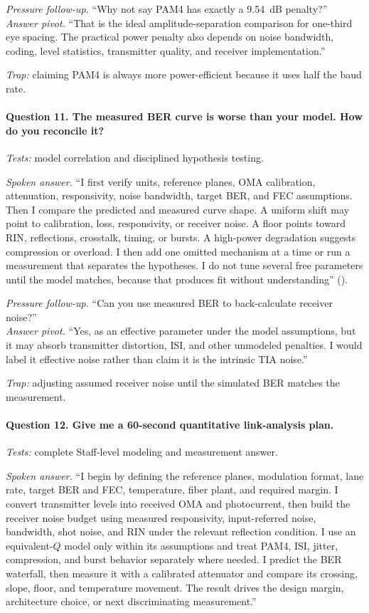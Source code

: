 \textit{Pressure follow-up.} ``Why not say PAM4 has exactly a 9.54~dB
penalty?''\\
\textit{Answer pivot.} ``That is the ideal amplitude-separation comparison for
one-third eye spacing. The practical power penalty also depends on noise
bandwidth, coding, level statistics, transmitter quality, and receiver
implementation.''

\textit{Trap:} claiming PAM4 is always more power-efficient because it uses half
the baud rate.

\paragraph{Question 11. The measured BER curve is worse than your model. How do
you reconcile it?}
\textit{Tests:} model correlation and disciplined hypothesis testing.

\textit{Spoken answer.}
``I first verify units, reference planes, OMA calibration, attenuation,
responsivity, noise bandwidth, target BER, and FEC assumptions. Then I compare
the predicted and measured curve shape. A uniform shift may point to
calibration, loss, responsivity, or receiver noise. A floor points toward RIN,
reflections, crosstalk, timing, or bursts. A high-power degradation suggests
compression or overload. I then add one omitted mechanism at a time or run a
measurement that separates the hypotheses. I do not tune several free parameters
until the model matches, because that produces fit without understanding''
().

\textit{Pressure follow-up.} ``Can you use measured BER to back-calculate
receiver noise?''\\
\textit{Answer pivot.} ``Yes, as an effective parameter under the model
assumptions, but it may absorb transmitter distortion, ISI, and other unmodeled
penalties. I would label it effective noise rather than claim it is the
intrinsic TIA noise.''

\textit{Trap:} adjusting assumed receiver noise until the simulated BER matches
the measurement.

\paragraph{Question 12. Give me a 60-second quantitative link-analysis plan.}
\textit{Tests:} complete Staff-level modeling and measurement answer.

\textit{Spoken answer.}
``I begin by defining the reference planes, modulation format, lane rate, target
BER and FEC, temperature, fiber plant, and required margin. I convert
transmitter levels into received OMA and photocurrent, then build the receiver
noise budget using measured responsivity, input-referred noise, bandwidth, shot
noise, and RIN under the relevant reflection condition. I use an equivalent-$Q$
model only within its assumptions and treat PAM4, ISI, jitter, compression, and
burst behavior separately where needed. I predict the BER waterfall, then
measure it with a calibrated attenuator and compare its crossing, slope, floor,
and temperature movement. The result drives the design margin, architecture
choice, or next discriminating measurement.''

